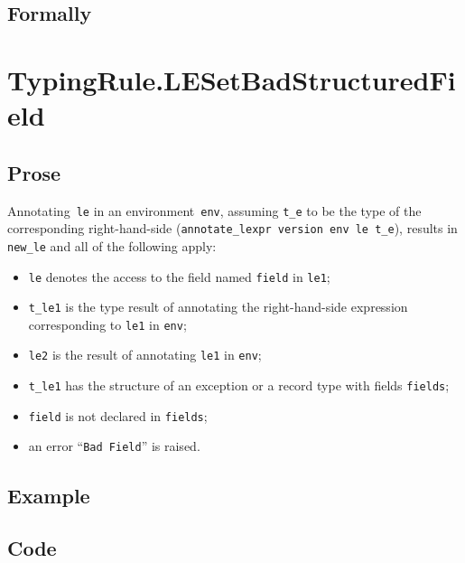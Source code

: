 \documentclass{book}
\begin{document}
\begin{emptyformal}
    \subsection{Formally}
\end{emptyformal}


\section{TypingRule.LESetBadStructuredField \label{sec:TypingRule.LESetBadStructuredField}}

  \subsection{Prose}
   Annotating~\texttt{le} in an environment~\texttt{env}, assuming
\texttt{t\_e} to be the type of the corresponding right-hand-side
(\texttt{annotate\_lexpr version env le t\_e}), results in \texttt{new\_le} and
all of the following apply:
   \begin{itemize}
   \item \texttt{le} denotes the access to the field named \texttt{field} in \texttt{le1};
   \item \texttt{t\_le1} is the type result of annotating the right-hand-side expression corresponding to \texttt{le1} in \texttt{env};
   \item \texttt{le2} is the result of annotating \texttt{le1} in \texttt{env};
   \item \texttt{t\_le1} has the structure of an exception or a record type with fields \texttt{fields};
   \item \texttt{field} is not declared in \texttt{fields};
   \item an error ``\texttt{Bad Field}'' is raised.
   \end{itemize}

  \subsection{Example}

  \subsection{Code}
\end{document}

